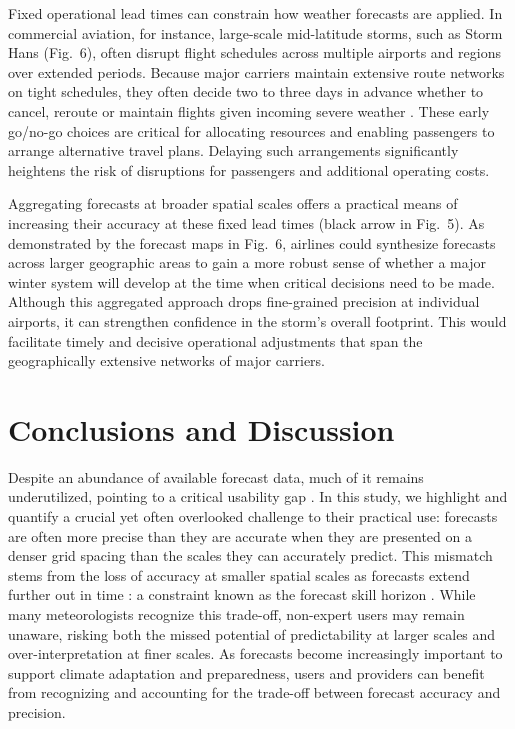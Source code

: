 \documentclass[preprint,12pt,authoryear]{elsarticle}
\begin{document}
Fixed operational lead times can constrain how weather forecasts are applied. In commercial aviation, for instance, large-scale mid-latitude storms, such as Storm Hans (Fig.~6), often disrupt flight schedules across multiple airports and regions over extended periods. Because major carriers maintain extensive route networks on tight schedules, they often decide two to three days in advance whether to cancel, reroute or maintain flights given incoming severe weather \citep{NBC2011,NYT2017}. These early go/no-go choices are critical for allocating resources and enabling passengers to arrange alternative travel plans. Delaying such arrangements significantly heightens the risk of disruptions for passengers and additional operating costs.

Aggregating forecasts at broader spatial scales offers a practical means of increasing their accuracy at these fixed lead times (black arrow in Fig.~5). As demonstrated by the forecast maps in Fig.~6, airlines could synthesize forecasts across larger geographic areas to gain a more robust sense of whether a major winter system will develop at the time when critical decisions need to be made. Although this aggregated approach drops fine-grained precision at individual airports, it can strengthen confidence in the storm’s overall footprint. This would facilitate timely and decisive operational adjustments that span the geographically extensive networks of major carriers.




\section{Conclusions and Discussion}


Despite an abundance of available forecast data, much of it remains underutilized, pointing to a critical usability gap \citep{Lemos2012, Vandenhurk2018, Findlater2021}. In this study, we highlight and quantify a crucial yet often overlooked challenge to their practical use: forecasts are often more precise than they are accurate when they are presented on a denser grid spacing than the scales they can accurately predict. This mismatch stems from the loss of accuracy at smaller spatial scales as forecasts extend further out in time \citep{Lorenz1969, TothBuizza2019}: a constraint known as the forecast skill horizon \citep{Buizza2015,BuizzLeutbecher2015}. While many meteorologists recognize this trade-off, non-expert users may remain unaware, risking both the missed potential of predictability at larger scales and over-interpretation at finer scales. As forecasts become increasingly important to support climate adaptation and preparedness, users and providers can benefit from recognizing and accounting for the trade-off between forecast accuracy and precision.
\end{document}

